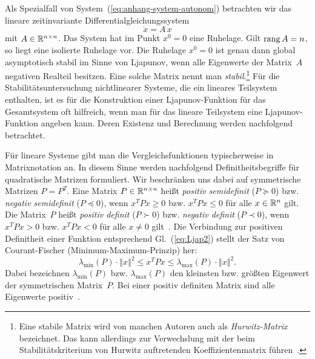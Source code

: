 Als Spezialfall von System~(\ref{eq:anhang-system-autonom}) betrachten
wir das lineare zeitinvariante Differentialgleichungssystem
\begin{equation}
\dot{x}=A\,x\label{eq:anhang-LTI-ohne-erregung}
\end{equation}
mit $A\in{\mathbb{R}}^{n\times n}$. Das System hat im Punkt $x^{0}=0$ eine
Ruhelage. Gilt ${\operatorname{rang}}\,A=n$, so liegt eine isolierte Ruhelage vor.
Die Ruhelage $x^{0}=0$ ist genau dann global asymptotisch stabil
im Sinne von Ljapunov, wenn alle Eigenwerte der Matrix~$A$ negativen
Realteil besitzen. Eine solche Matrix nennt man \emph{stabil}.\footnote{Eine stabile Matrix wird von manchen Autoren auch als \emph{Hurwitz-Matrix}
bezeichnet. Das kann allerdings zur Verwechslung mit der beim Stabilitätskriterium
von Hurwitz auftretenden Koeffizientenmatrix führen~\cite{gantmacher86,reinschke2014buch}.} Für die Stabilitätsuntersuchung nichtlinearer
Systeme, die ein lineares Teilsystem enthalten, ist es für die Konstruktion
einer Ljapunov-Funktion für das Gesamtsystem oft hilfreich, wenn man
für das lineare Teilsystem eine Ljapunov-Funktion angeben kann. Deren
Existenz und Berechnung werden nachfolgend betrachtet. 

Für lineare Systeme gibt man die Vergleichsfunktionen
typischerweise in Matrixnotation an. In diesem Sinne werden nachfolgend
Definitheitsbegriffe für quadratische Matrizen formuliert. Wir beschränken
uns dabei auf symmetrische Matrizen $P=P^{T}$. Eine Matrix $P\in{\mathbb{R}}^{n\times n}$
heißt \emph{positiv semidefinit}
($P\succeq0$) bzw. \emph{negativ semidefinit}
($P\preceq0$), wenn $x^{T}Px\geq0$ bzw. $x^{T}Px\leq0$ für alle
$x\in{\mathbb{R}}^{n}$ gilt. Die Matrix~$P$ heißt \emph{positiv definit}
($P\succ0$) bzw. \emph{negativ definit}
($P\prec0$), wenn $x^{T}Px>0$ bzw. $x^{T}Px<0$ für alle $x\neq0$
gilt~\cite{zhou1998}. Die Verbindung zur positiven Definitheit einer
Funktion entsprechend Gl.~(\ref{eq:Ljap2}) stellt der Satz von Courant-Fischer
(Minimum-Maximum-Prinzip) her:
\[
\lambda_{\min}(P)\cdot\left\Vert x\right\Vert ^{2}\leq x^{T}Px\leq\lambda_{\max}(P)\cdot\left\Vert x\right\Vert ^{2}.
\]
Dabei bezeichnen $\lambda_{\min}(P)$ bzw. $\lambda_{\max}(P)$ den
kleinsten bzw. größten Eigenwert der symmetrischen Matrix~$P$. Bei
einer positiv definiten Matrix sind alle Eigenwerte positiv~\cite{zeidler2003}.

